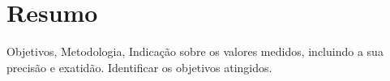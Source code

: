 \section{Resumo}

Objetivos, Metodologia, Indicação sobre os valores medidos, incluindo a sua precisão e exatidão. Identificar os objetivos atingidos.
